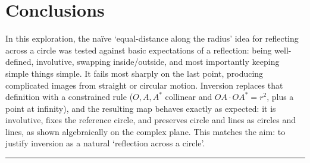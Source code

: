 \documentclass[a4paper, 12pt]{article}
\theoremstyle{definition}
\begin{document}
\section{Conclusions}
In this exploration, the naïve `equal-distance along the radius' idea for reflecting across a circle was tested against basic expectations of a reflection:
being well-defined, involutive, swapping inside/outside, and most importantly keeping simple things simple.
It fails most sharply on the last point, producing complicated images from straight or circular motion.
Inversion replaces that definition with a constrained rule ($O,A,A^*$ collinear and $OA\cdot OA^*=r^2$, plus a point at infinity), and the resulting map behaves exactly as expected:
it is involutive, fixes the reference circle, and preserves circle and lines as circles and lines, as shown algebraically on the complex plane.
This matches the aim: to justify inversion as a natural `reflection across a circle'.
\vspace*{4em}
\hrule
\printbibliography
\end{document}
